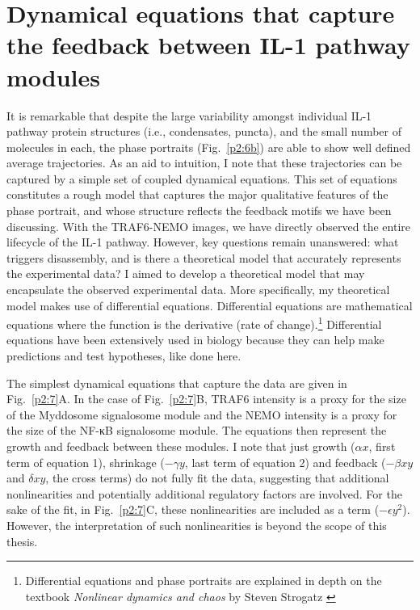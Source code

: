 \section{Dynamical equations that capture the feedback between IL-1 pathway modules}
\label{section:recapitulate_model}
It is remarkable that despite the large variability amongst individual IL-1 pathway protein structures (i.e., condensates, puncta), and the small number of molecules in each, the phase portraits (Fig.~\ref{p2:6b}) are able to show well defined average trajectories. As an aid to intuition, I note that these trajectories can be captured by a simple set of coupled dynamical equations. This set of equations constitutes a rough model that captures the major qualitative features of the phase portrait, and whose structure reflects the feedback motifs we have been discussing. With the TRAF6-NEMO images, we have directly observed the entire lifecycle of the IL-1 pathway. However, key questions remain unanswered: what triggers disassembly, and is there a theoretical model that accurately represents the experimental data? I aimed to develop a theoretical model that may encapsulate the observed experimental data. More specifically, my theoretical model makes use of differential equations. Differential equations are mathematical equations where the function is the derivative (rate of change).\footnote{Differential equations and phase portraits are explained in depth on the textbook \emph{Nonlinear dynamics and chaos} by Steven Strogatz \autocite{Strogatz_2018}} Differential equations have been extensively used in biology because they can help make predictions and test hypotheses, like done here. 

The simplest dynamical equations that capture the data are given in Fig.~\ref{p2:7}A. In the case of Fig.~\ref{p2:7}B, TRAF6 intensity is a proxy for the size of the Myddosome signalosome module and the NEMO intensity is a proxy for the size of the NF-κB signalosome module. The equations then represent the growth and feedback between these modules. I note that just growth ($\alpha x$, first term of equation 1), shrinkage ($-\gamma y$, last term of equation 2) and feedback ($-\beta xy$ and $\delta xy$, the cross terms) do not fully fit the data, suggesting that additional nonlinearities and potentially additional regulatory factors are involved. For the sake of the fit, in Fig.~\ref{p2:7}C, these nonlinearities are included as a term ($-\epsilon y^2$). However, the interpretation of such nonlinearities is beyond the scope of this thesis.



